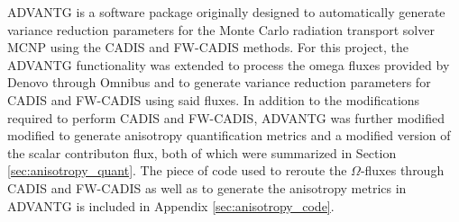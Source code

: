 ADVANTG \cite{mosher_new_2010} is a software package
originally designed to automatically
generate variance reduction
parameters for the Monte Carlo radiation transport solver
MCNP \cite{brown_mcnp_2002}
using the CADIS
and FW-CADIS methods. For this project, the ADVANTG functionality was extended to
process the omega fluxes provided by Denovo through Omnibus and to generate
variance reduction
parameters for CADIS and FW-CADIS using said fluxes. In addition to the
modifications required to perform CADIS and FW-CADIS, ADVANTG was further modified
modified to generate anisotropy quantification metrics and a modified version of
the scalar contributon flux, both of which were summarized in
Section \ref{sec:anisotropy_quant}. The piece of code used to
reroute the $\Omega$-fluxes
through CADIS and FW-CADIS as well as to generate the anisotropy metrics in
ADVANTG is included in Appendix \ref{sec:anisotropy_code}.
